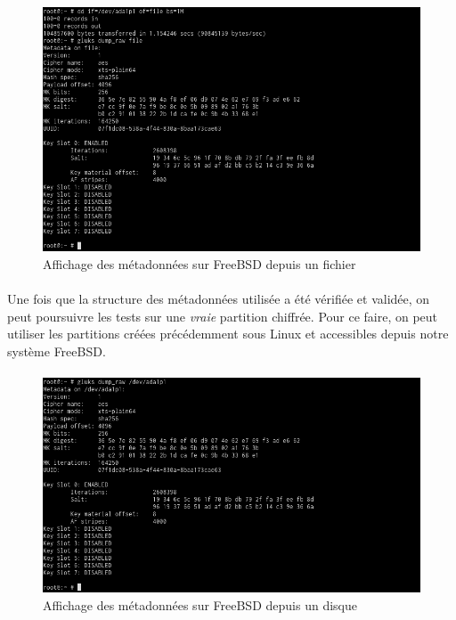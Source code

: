\paragraph{}
\begin{figure}[h]
\centering
\includegraphics[width=.9\linewidth]{tests/freebsd_dump_file.png}
\caption{\label{fig:freebsd_dump_file}Affichage des métadonnées sur FreeBSD
  depuis un fichier}
\end{figure}

\paragraph{}
Une fois que la structure des métadonnées utilisée a été vérifiée et validée, on
peut poursuivre les tests sur une \textit{vraie} partition chiffrée. Pour ce
faire, on peut utiliser les partitions créées précédemment sous Linux et
accessibles depuis notre système FreeBSD.
\paragraph{}
\begin{figure}[h]
\centering
\includegraphics[width=.9\linewidth]{tests/freebsd_dump_disk.png}
\caption{\label{fig:freebsd_dump_disk}Affichage des métadonnées sur FreeBSD
  depuis un disque}
\end{figure}

